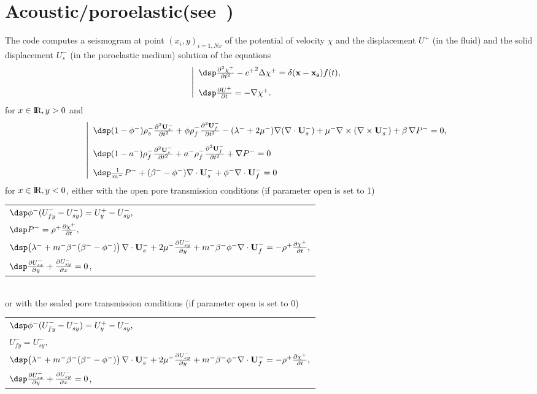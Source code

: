 \documentclass[11pt,a4]{article}
\begin{document}
\section{Acoustic/poroelastic(see~\cite{RAP_DE6509})}
The code computes  a seismogram at point
$(x_i,y)_{i=1,Nx}$ of the potential of velocity
$\chi$ and the displacement $U^+$ (in the fluid) and the
solid displacement $U_s^-$ (in the poroelastic medium) solution of the equations
$$ \begin{array}{lr}
\left|
 \begin{array}{l}
 \dsp \derp {^2 \chi^+}{t^2}-{c^+}^2 \Delta
 \chi^+=\delta({\mathbf
   x}-\mathbf{x_s})f(t),\\[10pt]
\dsp \derp {U^+} t =-\nabla \chi^+.
\end{array}
\right.
\end{array}$$
for $x\in\hbox{I}\!\hbox{R}, y>0$ and 
$$\begin{array}{lr}
\left|
  \begin{array}{l}
\dsp  (1-\phi^-)\rho_s^- \derp {^2
  \mathbf U_s^-}{t^2}+\phi\rho_f^-\derp {^2
  \mathbf U_f^-
}{t^2}-(\lambda^-+2\mu^-) \nabla (\nabla \cdot
\mathbf U_s^-)+\mu^-\nabla\times(\nabla \times \mathbf U_s^-)+\beta\,\nabla P^-=0
,\\[10pt]
    \dsp  (1-a^-)\rho_f^- \derp {^2
  \mathbf U_s^-}{t^2}+a^-\rho_f^-\derp {^2
  \mathbf U_f^-}{t^2}+\nabla P^-=0\\[10pt]
\dsp \frac 1 {m^-} P^- +(\beta^--\phi^-) \nabla \cdot \mathbf U_s^-+ \phi^- \nabla \cdot \mathbf U_f^-=0
  \end{array}
\right.
 \end{array}$$
for $x\in\hbox{I}\!\hbox{R}, y<0$, either with the open pore transmission
conditions (if parameter open is set to 1)\\[10pt] 
\begin{tabular}{|l} 
$\dsp \phi^-(U_{fy}^--U_{sy}^-)=U^+_y-U_{sy}^-,$\\[12pt]
$\dsp P^-=\rho^+\derp{\chi^+}{t},$\\[12pt]
$\dsp \big(\lambda^-+m^-\beta^-(\beta^--\phi^-)\big)\,\nabla\cdot \mathbf U_s^-+2\mu^-\derp{U_{sy}^-}{y}+m^-\beta^-\phi^-\nabla\cdot \mathbf U_f^-
=-\rho^+\derp{\chi^+}{t},$\\[12pt]
$\dsp\derp{U_{sx}^-}{y}+\derp{U_{sy}^-}{x}=0$,
\end{tabular}
\\[10pt]
or with the sealed pore transmission
conditions (if parameter open is set to 0)\\[10pt] 
\begin{tabular}{|l} 
$\dsp \phi^-(U_{fy}^--U_{sy}^-)=U^+_y-U_{sy}^-,$\\[12pt]
$U_{fy}^-=U_{sy}^-,$\\[12pt]
$\dsp \big(\lambda^-+m^-\beta^-(\beta^--\phi^-)\big)\,\nabla\cdot \mathbf U_s^-+2\mu^-\derp{U_{sy}^-}{y}+m^-\beta^-\phi^-\nabla\cdot \mathbf U_f^-
=-\rho^+\derp{\chi^+}{t},$\\[12pt]
$\dsp\derp{U_{sx}^-}{y}+\derp{U_{sy}^-}{x}=0$,
\end{tabular}
\end{document}
